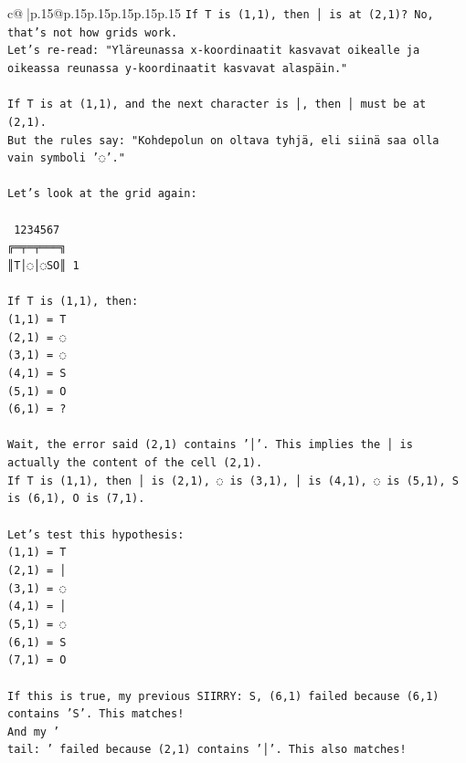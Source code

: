 \documentclass{article}
\begin{document}
{\begin{supertabular}{c@{$\;$}|p{.15\linewidth}@{}p{.15\linewidth}p{.15\linewidth}p{.15\linewidth}p{.15\linewidth}p{.15\linewidth}}
{{{\texttt{If T is (1,1), then │ is at (2,1)? No, that's not how grids work.} \\
\texttt{Let's re{-}read: "Yläreunassa x{-}koordinaatit kasvavat oikealle ja oikeassa reunassa y{-}koordinaatit kasvavat alaspäin."} \\
\\ 
\texttt{If T is at (1,1), and the next character is │, then │ must be at (2,1).} \\
\texttt{But the rules say: "Kohdepolun on oltava tyhjä, eli siinä saa olla vain symboli '◌'."} \\
\\ 
\texttt{Let's look at the grid again:} \\
\\ 
\texttt{ 1234567} \\
\texttt{╔═╤═╤═══╗} \\
\texttt{║T│◌│◌SO║ 1} \\
\\ 
\texttt{If T is (1,1), then:} \\
\texttt{(1,1) = T} \\
\texttt{(2,1) = ◌} \\
\texttt{(3,1) = ◌} \\
\texttt{(4,1) = S} \\
\texttt{(5,1) = O} \\
\texttt{(6,1) = ?} \\
\\ 
\texttt{Wait, the error said (2,1) contains '│'. This implies the │ is actually the content of the cell (2,1).} \\
\texttt{If T is (1,1), then │ is (2,1), ◌ is (3,1), │ is (4,1), ◌ is (5,1), S is (6,1), O is (7,1).} \\
\\ 
\texttt{Let's test this hypothesis:} \\
\texttt{(1,1) = T} \\
\texttt{(2,1) = │} \\
\texttt{(3,1) = ◌} \\
\texttt{(4,1) = │} \\
\texttt{(5,1) = ◌} \\
\texttt{(6,1) = S} \\
\texttt{(7,1) = O} \\
\\ 
\texttt{If this is true, my previous SIIRRY: S, (6,1) failed because (6,1) contains 'S'. This matches!} \\
\texttt{And my '} \\
\texttt{tail: ' failed because (2,1) contains '│'. This also matches!} \\
}}}
\end{supertabular}}
\end{document}

